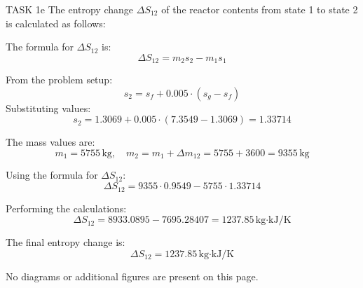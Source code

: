 TASK 1e  
The entropy change \( \Delta S_{12} \) of the reactor contents from state 1 to state 2 is calculated as follows:

The formula for \( \Delta S_{12} \) is:  
\[
\Delta S_{12} = m_2 s_2 - m_1 s_1
\]

From the problem setup:  
\[
s_2 = s_f + 0.005 \cdot (s_g - s_f)
\]
Substituting values:  
\[
s_2 = 1.3069 + 0.005 \cdot (7.3549 - 1.3069) = 1.33714
\]

The mass values are:  
\[
m_1 = 5755 \, \text{kg}, \quad m_2 = m_1 + \Delta m_{12} = 5755 + 3600 = 9355 \, \text{kg}
\]

Using the formula for \( \Delta S_{12} \):  
\[
\Delta S_{12} = 9355 \cdot 0.9549 - 5755 \cdot 1.33714
\]

Performing the calculations:  
\[
\Delta S_{12} = 8933.0895 - 7695.28407 = 1237.85 \, \text{kg·kJ/K}
\]  

The final entropy change is:  
\[
\Delta S_{12} = 1237.85 \, \text{kg·kJ/K}
\]  

No diagrams or additional figures are present on this page.
